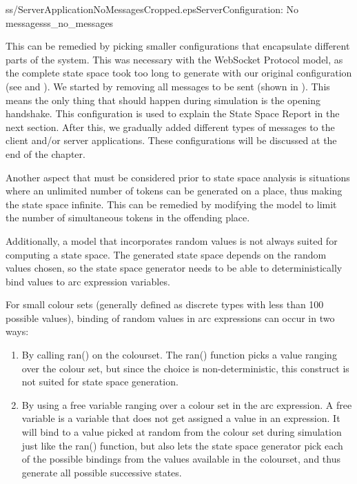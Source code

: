 		{ss/ServerApplicationNoMessagesCropped.eps}{Server}{Configuration:
		No messages}{ss_no_messages}
	
		This can be remedied by picking smaller configurations that encapsulate
		different parts of the system. This was necessary with the WebSocket Protocol
		model, as the complete state space took too long to generate with our
		original configuration (see  and ).
		We started by removing all messages to be sent (shown in
		).
		This means the only thing that should happen during simulation is the opening
		handshake. This configuration is used to explain the State Space Report in
		the next section.
		After this, we gradually added different types of messages to the client
		and/or server applications. These configurations will be discussed at the end
		of the chapter.
		
		Another aspect that must be considered prior to state space analysis is
		situations where an unlimited number of tokens can be generated on a place,
		thus making the state space infinite. This can be remedied by modifying the model to
		limit the number of simultaneous tokens in the offending place.
		
		Additionally, a model that incorporates random values is not always suited
		for computing a state space. The generated state space depends on the random
		values chosen, so the state space generator needs to be able to
		deterministically bind values to arc expression variables.
				
		For small colour sets (generally defined as discrete types with less
		than 100 possible values), binding of random values in arc expressions can
		occur in two ways: 
		\begin{enumerate}
		\item By calling ran() on the colourset. The ran() function picks a value
		ranging over the colour set, but since the choice is non-deterministic,
		this construct is not suited for state space generation.
		\item By using a free variable ranging over a colour set in the arc expression.
		A free variable is a variable that does not get assigned a value in an expression. It will 
		bind to a value picked at random from the colour set during simulation just
		like the ran() function, but also lets the state space generator pick each of 
		the possible bindings from the values available in the colourset, and thus
		generate all possible successive states. 
		\end{enumerate}
		
